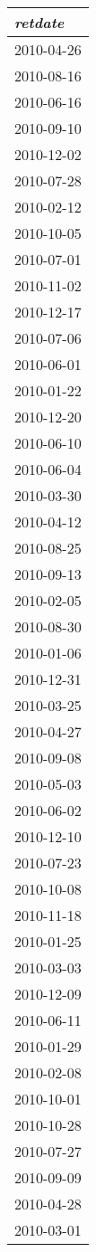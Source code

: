 \begin{tabular}{l}
\textit{retdate} \\
\hline
2010-04-26 \\
2010-08-16 \\
2010-06-16 \\
2010-09-10 \\
2010-12-02 \\
2010-07-28 \\
2010-02-12 \\
2010-10-05 \\
2010-07-01 \\
2010-11-02 \\
2010-12-17 \\
2010-07-06 \\
2010-06-01 \\
2010-01-22 \\
2010-12-20 \\
2010-06-10 \\
2010-06-04 \\
2010-03-30 \\
2010-04-12 \\
2010-08-25 \\
2010-09-13 \\
2010-02-05 \\
2010-08-30 \\
2010-01-06 \\
2010-12-31 \\
2010-03-25 \\
2010-04-27 \\
2010-09-08 \\
2010-05-03 \\
2010-06-02 \\
2010-12-10 \\
2010-07-23 \\
2010-10-08 \\
2010-11-18 \\
2010-01-25 \\
2010-03-03 \\
2010-12-09 \\
2010-06-11 \\
2010-01-29 \\
2010-02-08 \\
2010-10-01 \\
2010-10-28 \\
2010-07-27 \\
2010-09-09 \\
2010-04-28 \\
2010-03-01 \\

\end{tabular}

